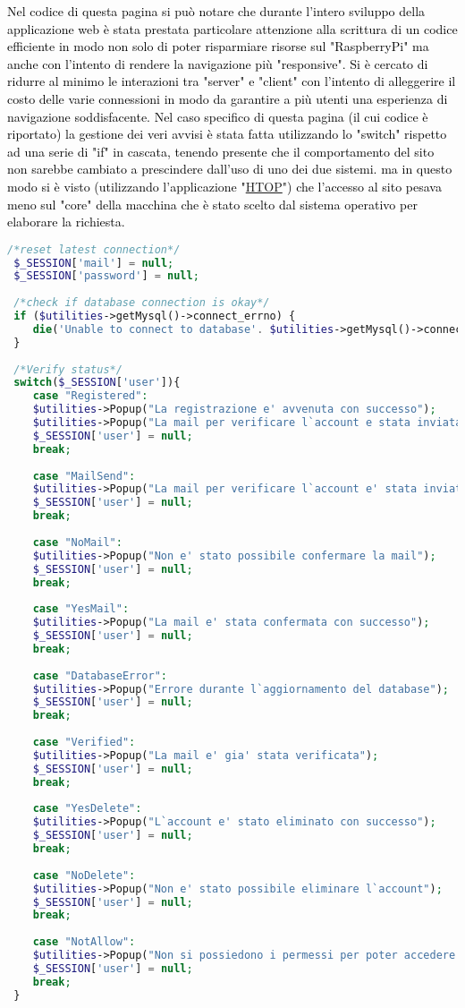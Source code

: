   \textcolor{black}{Nel codice di questa pagina si può notare che durante l'intero sviluppo della applicazione web è stata prestata particolare attenzione alla scrittura di un codice efficiente in modo non solo di poter risparmiare risorse sul "RaspberryPi" ma anche con l'intento di rendere la navigazione più "responsive". Si è cercato di ridurre al minimo le interazioni tra "server" e "client" con l'intento di alleggerire il costo delle varie connessioni in modo da garantire a più utenti una esperienza di navigazione soddisfacente. Nel caso specifico di questa pagina (il cui codice è riportato) la gestione dei veri avvisi è stata fatta utilizzando lo "switch" rispetto ad una serie di "if" in cascata, tenendo presente che il comportamento del sito non sarebbe cambiato a prescindere dall'uso di uno dei due sistemi. ma in questo modo si è visto (utilizzando l'applicazione "\href{https://htop.dev/}{HTOP}") che l'accesso al sito pesava meno sul "core" della macchina che è stato scelto dal sistema operativo per elaborare la richiesta.}\\
  
 \begin{lstlisting}[language=php]
 /*reset latest connection*/
 $_SESSION['mail'] = null;
 $_SESSION['password'] = null;
 
 /*check if database connection is okay*/
 if ($utilities->getMysql()->connect_errno) {
 	die('Unable to connect to database'. $utilities->getMysql()->connect_error);
 }
 
 /*Verify status*/
 switch($_SESSION['user']){
 	case "Registered":
 	$utilities->Popup("La registrazione e' avvenuta con successo");
 	$utilities->Popup("La mail per verificare l`account e stata inviata");
 	$_SESSION['user'] = null;
 	break;
 	
 	case "MailSend":
 	$utilities->Popup("La mail per verificare l`account e' stata inviata");
 	$_SESSION['user'] = null;
 	break;
 	
 	case "NoMail":
 	$utilities->Popup("Non e' stato possibile confermare la mail");
 	$_SESSION['user'] = null;
 	break;
 	
 	case "YesMail":
 	$utilities->Popup("La mail e' stata confermata con successo");
 	$_SESSION['user'] = null;
 	break;
 	
 	case "DatabaseError":
 	$utilities->Popup("Errore durante l`aggiornamento del database");
 	$_SESSION['user'] = null;
 	break;
 	
 	case "Verified":
 	$utilities->Popup("La mail e' gia' stata verificata");
 	$_SESSION['user'] = null;
 	break;
 	
 	case "YesDelete":
 	$utilities->Popup("L`account e' stato eliminato con successo");
 	$_SESSION['user'] = null;
 	break;
 	
 	case "NoDelete":
 	$utilities->Popup("Non e' stato possibile eliminare l`account");
 	$_SESSION['user'] = null;
 	break;
 	
 	case "NotAllow":
 	$utilities->Popup("Non si possiedono i permessi per poter accedere alla pagina");
 	$_SESSION['user'] = null;
 	break;
 }
\end{lstlisting}

